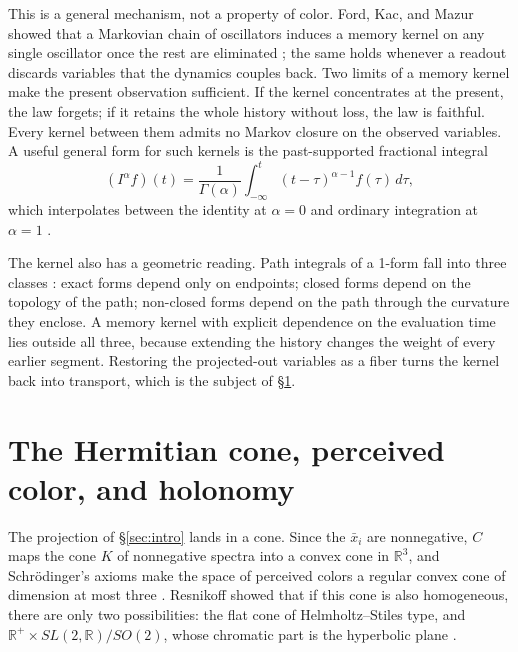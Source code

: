\documentclass[11pt]{article}
\theoremstyle{boldplain}
\theoremstyle{boldupright}
\begin{document}
This is a general mechanism, not a property of color. Ford, Kac, and Mazur showed that a
Markovian chain of oscillators induces a memory kernel on any single oscillator once the rest are
eliminated \cite{ford1965}; the same holds whenever a readout discards variables that the dynamics couples back.
Two limits of a memory kernel make the present observation sufficient. If the kernel concentrates at
the present, the law forgets; if it retains the whole history without loss, the law is faithful. Every
kernel between them admits no Markov closure on the observed variables. A useful general form for
such kernels is the past-supported fractional integral
\begin{equation}\label{eq:fracint}
(I^\alpha f)(t)=\frac{1}{\Gamma(\alpha)}\int_{-\infty}^t(t-\tau)^{\alpha-1}f(\tau)\,d\tau,
\end{equation}
which interpolates between the identity at $\alpha=0$ and ordinary integration at $\alpha=1$ \cite{samko1993}.

The kernel also has a geometric reading. Path integrals of a 1-form fall into three classes \cite{bott1982}:
exact forms depend only on endpoints; closed forms depend on the topology of the path; non-closed
forms depend on the path through the curvature they enclose. A memory kernel with explicit
dependence on the evaluation time lies outside all three, because extending the history changes the
weight of every earlier segment. Restoring the projected-out variables as a fiber turns the kernel
back into transport, which is the subject of \S\ref{sec:hermitian}.

\section{The Hermitian cone, perceived color, and holonomy}\label{sec:hermitian}

The projection of \S\ref{sec:intro} lands in a cone. Since the $\bar x_i$ are nonnegative, $C$ maps the cone $K$ of nonnegative
spectra into a convex cone in $\mathbb{R}^3$, and Schr\"odinger's axioms make the space of perceived colors
a regular convex cone of dimension at most three \cite{schrodinger1920,provenzi2020}. Resnikoff showed that if this cone is
also homogeneous, there are only two possibilities: the flat cone of Helmholtz--Stiles type, and
$\mathbb{R}^+\times SL(2,\mathbb{R})/SO(2)$, whose chromatic part is the hyperbolic plane \cite{resnikoff1974,provenzi2020}.
\end{document}
